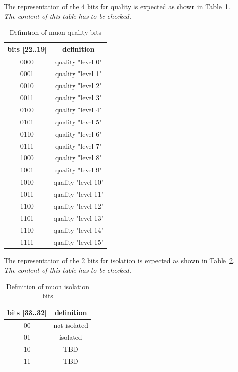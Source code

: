 The representation of the 4 bits for quality is expected as shown in Table~\ref{tab:gtl:muon_quality_bits}.\\
\textit{The content of this table has to be checked.}
 
\begin{table}[ht]
\caption{Definition of muon quality bits}
\vspace{5mm}
\centering
\begin{tabular}{|c|c|}\hline
bits [22..19] & definition \\\hline\hline
0000 & quality "level 0" \\
0001 & quality "level 1" \\
0010 & quality "level 2" \\
0011 & quality "level 3" \\
0100 & quality "level 4" \\
0101 & quality "level 5" \\
0110 & quality "level 6" \\
0111 & quality "level 7" \\
1000 & quality "level 8" \\
1001 & quality "level 9" \\
1010 & quality "level 10" \\
1011 & quality "level 11" \\
1100 & quality "level 12" \\
1101 & quality "level 13" \\
1110 & quality "level 14" \\
1111 & quality "level 15" \\\hline
\end{tabular}
\label{tab:gtl:muon_quality_bits}
\end{table}

The representation of the 2 bits for isolation is expected as shown in Table~\ref{tab:gtl:muon_iso_bits}.\\
\textit{The content of this table has to be checked.}
 
\begin{table}[ht]
\caption{Definition of muon isolation bits}
\vspace{5mm}
\centering
\begin{tabular}{|c|c|}\hline
bits [33..32] & definition \\\hline\hline
00 & not isolated \\
01 & isolated \\
10 & TBD \\
11 & TBD \\\hline
\end{tabular}
\label{tab:gtl:muon_iso_bits}
\end{table}

